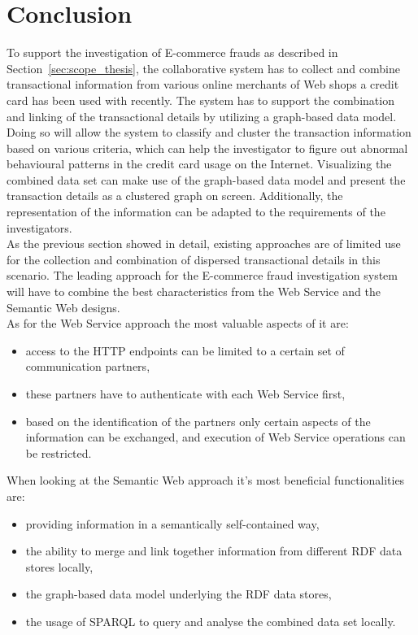 
\section{Conclusion}
\label{sec:concept_conclusion}

To support the investigation of \gls{E-commerce} frauds as described in Section~\ref{sec:scope_thesis}, the collaborative system has to collect and combine transactional information from various online merchants of Web shops a credit card has been used with recently. The system has to support the combination and linking of the transactional details by utilizing a graph-based data model. Doing so will allow the system to classify and cluster the transaction information based on various criteria, which can help the investigator to figure out abnormal behavioural patterns in the credit card usage on the Internet. Visualizing the combined data set can make use of the graph-based data model and present the transaction details as a clustered graph on screen. Additionally, the representation of the information can be adapted to the requirements of the investigators. \\

As the previous section showed in detail, existing approaches are of limited use for the collection and combination of dispersed transactional details in this scenario. The leading approach for the \gls{E-commerce} fraud investigation system will have to combine the best characteristics from the Web Service and the Semantic Web designs. \\

As for the Web Service approach the most valuable aspects of it are: \@

\begin{itemize}
	\item access to the \gls{HTTP} endpoints can be limited to a certain set of communication partners,
	\item these partners have to authenticate with each Web Service first,
	\item based on the identification of the partners only certain aspects of the information can be exchanged, and execution of Web Service operations can be restricted.
\end{itemize}

When looking at the Semantic Web approach it's most beneficial functionalities are: \@

\begin{itemize}
	\item providing information in a semantically self-contained way,
	\item the ability to merge and link together information from different \gls{RDF} data stores locally,
	\item the graph-based data model underlying the \gls{RDF} data stores,
	\item the usage of \gls{SPARQL} to query and analyse the combined data set locally.
\end{itemize}

